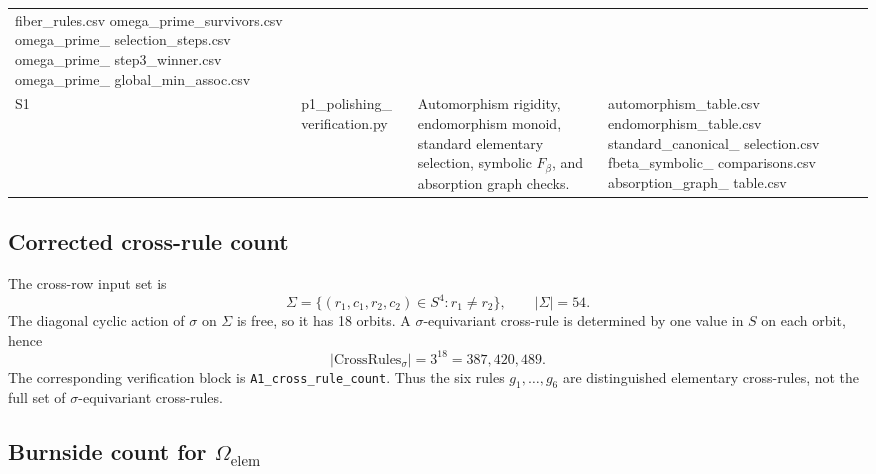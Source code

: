 \documentclass[11pt]{article}
\begin{document}
\begin{center}
\begin{longtable}{@{}p{}p{}p{}p{}@{}}
{\ttfamily fiber\_rules.csv}\newline
{\ttfamily omega\_prime\_survivors.csv}\newline
{\ttfamily omega\_prime\_}\newline
{\ttfamily selection\_steps.csv}\newline
{\ttfamily omega\_prime\_}\newline
{\ttfamily step3\_winner.csv}\newline
{\ttfamily omega\_prime\_}\newline
{\ttfamily global\_min\_assoc.csv} \\
\addlinespace
S1 &
{\ttfamily p1\_polishing\_}\newline
{\ttfamily verification.py} &
Automorphism rigidity, endomorphism monoid, standard elementary selection, symbolic \(F_\beta\), and absorption graph checks. &
{\ttfamily automorphism\_table.csv}\newline
{\ttfamily endomorphism\_table.csv}\newline
{\ttfamily standard\_canonical\_}\newline
{\ttfamily selection.csv}\newline
{\ttfamily fbeta\_symbolic\_}\newline
{\ttfamily comparisons.csv}\newline
{\ttfamily absorption\_graph\_}\newline
{\ttfamily table.csv} \\
\bottomrule
\end{longtable}
\end{center}

\subsection{Corrected cross-rule count}

The cross-row input set is
\[
\Sigma=\{(r_1,c_1,r_2,c_2)\in S^4:r_1\ne r_2\},
\qquad |\Sigma|=54.
\]
The diagonal cyclic action of \(\sigma\) on \(\Sigma\) is free, so it has 18
orbits. A \(\sigma\)-equivariant cross-rule is determined by one value in \(S\)
on each orbit, hence
\[
|\mathrm{CrossRules}_\sigma|=3^{18}=387{,}420{,}489.
\]
The corresponding verification block is \texttt{A1\_cross\_rule\_count}. Thus
the six rules \(g_1,\ldots,g_6\) are distinguished elementary cross-rules, not
the full set of \(\sigma\)-equivariant cross-rules.

\subsection{Burnside count for \texorpdfstring{\(\Omega_{\mathrm{elem}}\)}{Omega-elem}}
\end{document}
